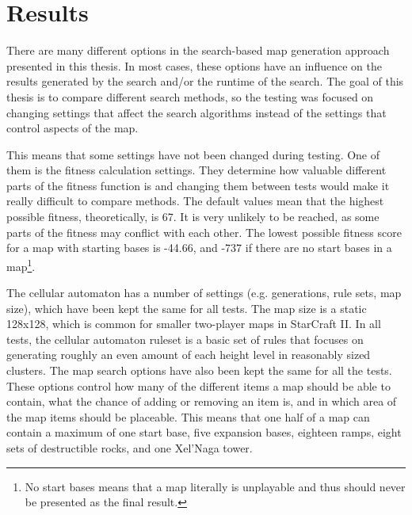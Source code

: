 \chapter{Results}
\label{results}
There are many different options in the search-based map generation approach presented in this thesis. In most cases, these options have an influence on the results generated by the search and/or the runtime of the search. The goal of this thesis is to compare different search methods, so the testing was focused on changing settings that affect the search algorithms instead of the settings that control aspects of the map.

This means that some settings have not been changed during testing. One of them is the fitness calculation settings. They determine how valuable different parts of the fitness function is and changing them between tests would make it really difficult to compare methods. The default values mean that the highest possible fitness, theoretically, is 67. It is very unlikely to be reached, as some parts of the fitness may conflict with each other. The lowest possible fitness score for a map with starting bases is -44.66, and -737 if there are no start bases in a map\footnote{No start bases means that a map literally is unplayable and thus should never be presented as the final result.}.

The cellular automaton has a number of settings (e.g. generations, rule sets, map size), which have been kept the same for all tests. The map size is a static 128x128, which is common for smaller two-player maps in StarCraft II. In all tests, the cellular automaton ruleset is a basic set of rules that focuses on generating roughly an even amount of each height level in reasonably sized clusters. The map search options have also been kept the same for all the tests. These options control how many of the different items a map should be able to contain, what the chance of adding or removing an item is, and in which area of the map items should be placeable. This means that one half of a map can contain a maximum of one start base, five expansion bases, eighteen ramps, eight sets of destructible rocks, and one Xel'Naga tower. 




